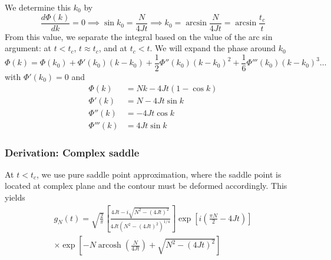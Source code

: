 \documentclass[../../../main.tex]{subfiles}
\begin{document}
We determine this $k_0$ by
\begin{equation*}
    \frac{d\Phi(k )}{dk} = 0 \implies
    \sin k_0 = \frac{N }{4Jt} \implies
    k_0 = \arcsin \frac{N }{4Jt} = \arcsin \frac{t_c }{t}
\end{equation*}
From this value, we separate the integral based on the value of the arc sin argument: at $t<t_c$, $t \approx t_c$, and at $t_c<t$.
We will expand the phase around $k_0$
\begin{equation*}
    \Phi (k )  =  \Phi(k_0) +  \Phi'(k_0)(k-k_0) + \frac{1}{2}\Phi''(k_0)(k-k_0)^2 + \frac{1 }{6 }\Phi'''(k_0)(k-k_0)^3\dots
\end{equation*}
with $\Phi'(k_0) = 0$ and
\begin{align*}
    \Phi(k)    & =  Nk - 4Jt (1  - \cos k) \\
    \Phi'(k)   & =  N -4Jt\sin k           \\
    \Phi''(k)  & = - 4Jt \cos k            \\
    \Phi'''(k) & = 4Jt \sin k
\end{align*}

\subsubsection{Derivation: Complex saddle}
At $t<t_c$, we use pure saddle point approximation, where the saddle point is located at complex plane and the contour must be deformed accordingly.
This yields
\begin{multline*}
    g_N(t) = \sqrt{\frac{2}{\pi}} \left[ \frac{4Jt - i \sqrt{N^2 - (4Jt)^2}}{4Jt \left( N^2 - (4Jt)^2 \right)^{1/4}} \right]
    \exp\left[ i\left( \frac{\pi N}{2} - 4Jt \right) \right]\\
    \times \exp\left[ -N \operatorname{arcosh} \left(\frac{N}{4Jt}\right) + \sqrt{N^2 - (4Jt)^2} \right]
\end{multline*}
\end{document}
